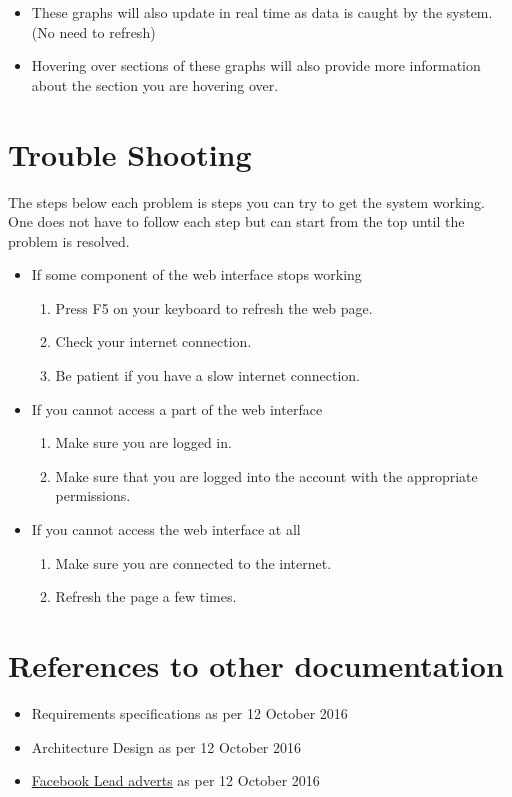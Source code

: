 \documentclass{article}
\begin{document}
			\begin{itemize}
				\item These graphs will also update in real time as data is caught by the system. (No need to refresh)
				\item Hovering over sections of these graphs will also provide more information about the section you are hovering over.
			\end{itemize}

	\section{Trouble Shooting}
		The steps below each problem is steps you can try to get the system working.
		One does not have to follow each step but can start from the top until the problem is resolved.
		\begin{itemize}
			\item If some component of the web interface stops working
				\begin{enumerate}
					\item Press F5 on your keyboard to refresh the web page.
					\item Check your internet connection.
					\item Be patient if you have a slow internet connection.
				\end{enumerate}
			\item If you cannot access a part of the web interface
				\begin{enumerate}
					\item Make sure you are logged in.
					\item Make sure that you are logged into the account with the appropriate permissions.
				\end{enumerate}
			\item If you cannot access the web interface at all
				\begin{enumerate}
					\item Make sure you are connected to the internet.
					\item Refresh the page a few times.
				\end{enumerate}
		\end{itemize}

	\section{References to other documentation}
		\begin{itemize}
			\item{Requirements specifications as per 12 October 2016}
			\item{Architecture Design as per 12 October 2016}
			\item{\href{https://www.facebook.com/business/a/lead-ads}{Facebook Lead adverts} as per 12 October 2016}
		\end{itemize}
\end{document}
